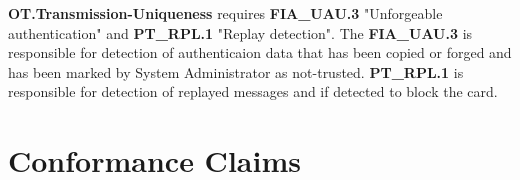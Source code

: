 \documentclass[10pt,titlepage]{article}
\begin{document}
 
\textbf{OT.Transmission-Uniqueness} requires \textbf{FIA\_UAU.3} "Unforgeable authentication" and \textbf{PT\_RPL.1} "Replay detection". The \textbf{FIA\_UAU.3} is responsible for detection of authenticaion data that has been copied or forged and has been marked by System Administrator as not-trusted. \textbf{PT\_RPL.1} is responsible for detection of replayed messages and if detected to block the card. 
 
\section{Conformance Claims}





\end{document}

